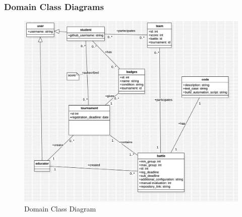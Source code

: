 \clearpage
\subsubsection{Domain Class Diagrams}
\begin{figure}
  \centering
  \includegraphics[width=1\textwidth]{2Overall_Description/res/ClassDiagram1 (1).jpg}
  \caption{Domain Class Diagram}
\end{figure}